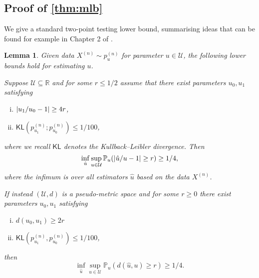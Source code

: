 \documentclass[journal]{IEEEtran}
\newtheorem{lemma}{Lemma}
\newcommand{\1}{\boldsymbol{1}}
\newcommand{\EE}{\mathbb{E}}
\newcommand{\PP}{\mathbb{P}}
\newcommand{\KL}{\mathsf{KL}}
\DeclarePairedDelimiter{\abs}{\lvert}{\rvert}
\newcommand{\RR}{\mathbb{R}}
\begin{document}
\subsection{Proof of \cref{thm:mlb}}
\label{sec:proof-thm:mlb}
We give a standard two-point testing lower bound, summarising ideas that can be found for example in Chapter 2 of \cite{tsybakov:2009}.
\begin{lemma}\label{lem:2-point-testing-bound}
	Given data $X^{(n)}\sim p_u^{(n)}$ for parameter $u\in\mathcal{U}$, the following lower bounds hold for estimating $u$.

	Suppose $\mathcal{U}\subseteq \RR$ and for some $r\leq 1/2$ assume that there exist parameters $u_0,u_1$ satisfying
	\begin{enumerate}[i.]
		\item $\abs{u_1/u_0-1}\geq 4r$,
		\item $\KL(p^{(n)}_{u_1};p^{(n)}_{u_0})\leq 1/100$,
	\end{enumerate}
	where we recall $\KL$ denotes the Kullback--Leibler divergence. %
	Then
	\[\inf_{\hat{u}}\sup_{u\in \mathcal{U}} \PP_u( \abs{\hat{u}/u-1}\geq r) \geq 1/4,\]
	where the infimum is over all estimators $\hat{u}$ based on the data $X^{(n)}$.

	If instead $(\mathcal{U},d)$ is a pseudo-metric space and for some $r\geq 0$ there exist parameters $u_0,u_1$ satisfying
	\begin{enumerate}[i.]
		\item $d(u_0,u_1)\geq 2r$
		\item $\KL(p^{(n)}_{u_1},p^{(n)}_{u_0})\leq 1/100$,
	\end{enumerate}
	then
	\[\inf_{\hat{u}}\sup_{u\in \mathcal{U}} \PP_u( d(\hat{u},u)\geq r)\geq 1/4.\]
\end{lemma}
\end{document}
